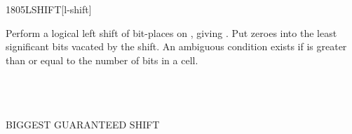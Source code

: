 \vspace*{-1.5ex}\enlargethispage{8ex}
\begin{worddef}{1805}{LSHIFT}[l-shift]
\item {}

	Perform a logical left shift of  bit-places on
	, giving . Put zeroes into the least
	significant bits vacated by the shift. An ambiguous condition
	exists if  is greater than or equal to the number of
	bits in a cell.

	\begin{testing} %
		 \\
		 \\
		 \\
		 \tab[2]  BIGGEST GUARANTEED SHIFT \\
		 \\
	\end{testing}
\end{worddef}

